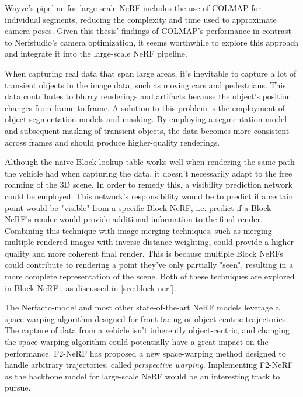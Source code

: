 Wayve's pipeline for large-scale NeRF includes the use of COLMAP for individual segments, reducing the complexity and time used to approximate camera poses. Given this thesis' findings of COLMAP's performance in contrast to Nerfstudio's camera optimization, it seems worthwhile to explore this approach and integrate it into the large-scale NeRF pipeline.

When capturing real data that span large areas, it's inevitable to capture a lot of transient objects in the image data, such as moving cars and pedestrians. This data contributes to blurry renderings and artifacts because the object's position changes from frame to frame. A solution to this problem is the employment of object segmentation models and masking. By employing a segmentation model and subsequent masking of transient objects, the data becomes more consistent across frames and should produce higher-quality renderings.

Although the naive Block lookup-table works well when rendering the same path the vehicle had when capturing the data, it doesn't necessarily adapt to the free roaming of the 3D scene. In order to remedy this, a visibility prediction network could be employed. This network's responsibility would be to predict if a certain point would be "visible" from a specific Block NeRF, i.e. predict if a Block NeRF's render would provide additional information to the final render. Combining this technique with image-merging techniques, such as merging multiple rendered images with inverse distance weighting, could provide a higher-quality and more coherent final render. This is because multiple Block NeRFs could contribute to rendering a point they've only partially "seen", resulting in a more complete representation of the scene. Both of these techniques are explored in Block NeRF \cite{tancik_block-nerf_2022}, as discussed in \autoref{sec:block-nerf}.

The Nerfacto-model and most other state-of-the-art NeRF models leverage a space-warping algorithm designed for front-facing or object-centric trajectories. The capture of data from a vehicle isn't inherently object-centric, and changing the space-warping algorithm could potentially have a great impact on the performance. F2-NeRF \cite{...} has proposed a new space-warping method designed to handle arbitrary trajectories, called \textit{perspective warping}. Implementing F2-NeRF as the backbone model for large-scale NeRF would be an interesting track to pursue.





